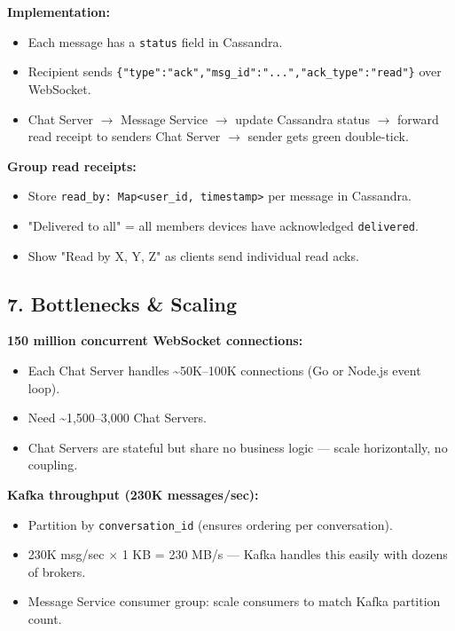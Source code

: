 \documentclass[11pt]{article}
\providecommand{\tightlist}{\setlength{\itemsep}{1pt}\setlength{\parskip}{0pt}}
\begin{document}
\textbf{Implementation:}

\begin{itemize}
\tightlist
\item
  Each message has a \texttt{status} field in Cassandra.
\item
  Recipient sends \texttt{\{"type":"ack","msg\_id":"...","ack\_type":"read"\}} over WebSocket.
\item
  Chat Server \(\rightarrow\) Message Service \(\rightarrow\) update Cassandra status \(\rightarrow\) forward read receipt to sender\textquotesingle s Chat Server \(\rightarrow\) sender gets green double-tick.
\end{itemize}

\textbf{Group read receipts:}

\begin{itemize}
\tightlist
\item
  Store \texttt{read\_by:\ Map\textless{}user\_id,\ timestamp\textgreater{}} per message in Cassandra.
\item
  "Delivered to all" = all members\textquotesingle{} devices have acknowledged \texttt{delivered}.
\item
  Show "Read by X, Y, Z" as clients send individual read acks.
\end{itemize}

\subsection{7. Bottlenecks \& Scaling}\label{7-bottlenecks--scaling-3}

\textbf{150 million concurrent WebSocket connections:}

\begin{itemize}
\tightlist
\item
  Each Chat Server handles \textasciitilde50K--100K connections (Go or Node.js event loop).
\item
  Need \textasciitilde1,500--3,000 Chat Servers.
\item
  Chat Servers are stateful but share no business logic --- scale horizontally, no coupling.
\end{itemize}

\textbf{Kafka throughput (230K messages/sec):}

\begin{itemize}
\tightlist
\item
  Partition by \texttt{conversation\_id} (ensures ordering per conversation).
\item
  230K msg/sec \(\times\) 1 KB = 230 MB/s --- Kafka handles this easily with dozens of brokers.
\item
  Message Service consumer group: scale consumers to match Kafka partition count.
\end{itemize}
\end{document}
